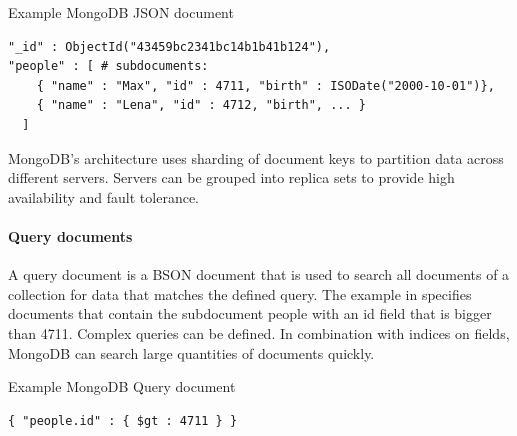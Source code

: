 \documentclass{../../template/esiwace-report}
\begin{document}
\begin{tcbcode}[label={lst:mongoJSON}]{Example MongoDB JSON document}
\begin{lstlisting}
"_id" : ObjectId("43459bc2341bc14b1b41b124"),
"people" : [ # subdocuments:
    { "name" : "Max", "id" : 4711, "birth" : ISODate("2000-10-01")},
    { "name" : "Lena", "id" : 4712, "birth", ... }  
  ] 
\end{lstlisting}
\end{tcbcode}


MongoDB's architecture uses sharding of document keys to partition data across different servers.
Servers can be grouped into replica sets to provide high availability and fault tolerance.

\paragraph{Query documents}

A query document is a BSON document that is used to search all documents of a collection for data that matches the defined query.
The example in  specifies documents that contain the subdocument people with an id field that is bigger than 4711.
Complex queries can be defined.
In combination with indices on fields, MongoDB can search large quantities of documents quickly.

\begin{tcbcode}[label={lst:mongoQuery}]{Example MongoDB Query document}
\begin{lstlisting}
{ "people.id" : { $gt : 4711 } }
\end{lstlisting}
\end{tcbcode}








\end{document}
